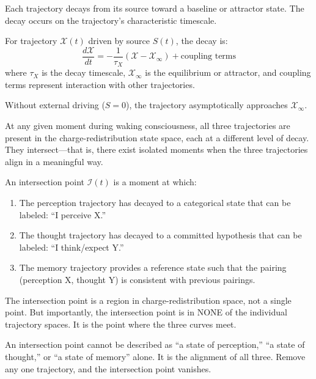 Each trajectory decays from its source toward a baseline or attractor state. The decay occurs on the trajectory's characteristic timescale.

\begin{definition}
For trajectory $\mathcal{X}(t)$ driven by source $S(t)$, the decay is:
\begin{equation}
\frac{d\mathcal{X}}{dt} = -\frac{1}{\tau_X}(\mathcal{X} - \mathcal{X}_{\infty}) + \text{coupling terms}
\end{equation}
where $\tau_X$ is the decay timescale, $\mathcal{X}_{\infty}$ is the equilibrium or attractor, and coupling terms represent interaction with other trajectories.

Without external driving ($S = 0$), the trajectory asymptotically approaches $\mathcal{X}_{\infty}$.
\end{definition}

At any given moment during waking consciousness, all three trajectories are present in the charge-redistribution state space, each at a different level of decay. They intersect—that is, there exist isolated moments when the three trajectories align in a meaningful way.

\begin{definition}
\label{def:intersection}
An intersection point $\mathcal{I}(t)$ is a moment at which:
\begin{enumerate}[label=(\roman*),leftmargin=*,itemsep=1pt]
\item The perception trajectory has decayed to a categorical state that can be labeled: ``I perceive X.''
\item The thought trajectory has decayed to a committed hypothesis that can be labeled: ``I think/expect Y.''
\item The memory trajectory provides a reference state such that the pairing (perception X, thought Y) is consistent with previous pairings.
\end{enumerate}

The intersection point is a region in charge-redistribution space, not a single point. But importantly, the intersection point is in NONE of the individual trajectory spaces. It is the point where the three curves meet.
\end{definition}

\begin{remark}
An intersection point cannot be described as ``a state of perception,'' ``a state of thought,'' or ``a state of memory'' alone. It is the alignment of all three. Remove any one trajectory, and the intersection point vanishes.
\end{remark}

